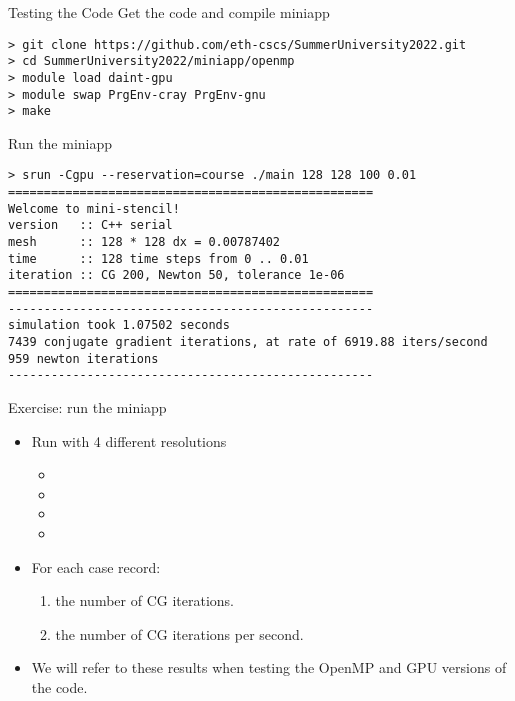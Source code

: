 \documentclass[aspectratio=43]{beamer}
\begin{document}
\begin{frame}[fragile]{Testing the Code}
    Get the code and compile miniapp
\begin{lstlisting}[style=terminal]
> git clone https://github.com/eth-cscs/SummerUniversity2022.git
> cd SummerUniversity2022/miniapp/openmp
> module load daint-gpu
> module swap PrgEnv-cray PrgEnv-gnu
> make
\end{lstlisting}
    Run the miniapp
\begin{lstlisting}[style=terminal]
> srun -Cgpu --reservation=course ./main 128 128 100 0.01
===================================================
Welcome to mini-stencil!
version   :: C++ serial
mesh      :: 128 * 128 dx = 0.00787402
time      :: 128 time steps from 0 .. 0.01
iteration :: CG 200, Newton 50, tolerance 1e-06
===================================================
---------------------------------------------------
simulation took 1.07502 seconds
7439 conjugate gradient iterations, at rate of 6919.88 iters/second
959 newton iterations
---------------------------------------------------
\end{lstlisting}
\end{frame}

\begin{frame}[fragile]{Exercise: run the miniapp}
    \begin{itemize}
        \item Run with 4 different resolutions
        \begin{itemize}
            \item {}
            \item {}
            \item {}
            \item {}
        \end{itemize}
        \item For each case record:
        \begin{enumerate}
            \item the number of CG iterations.
            \item the number of CG iterations per second.
        \end{enumerate}
        \item We will refer to these results when testing the OpenMP and GPU versions of the code.
    \end{itemize}
\end{frame}
\end{document}
